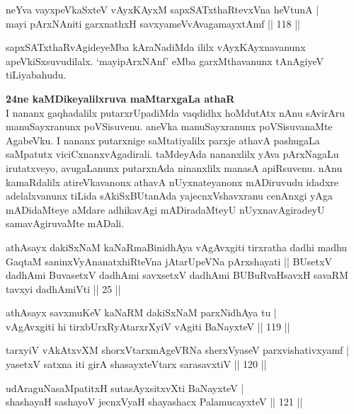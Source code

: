 \begin{shl}
neYva vayxpeVkaSxteV vAyxKAyxM sapxSATxthaRtevxVna heVtunA | \\
mayi pArxNAniti garxnathxH savxyameVvAvagamayxtAmf \hfill|| 118 || 
\end{shl}

\begin{artha}
sapxSATxthaRvAgideyeMba kAraNadiMda ililx vAyxKAyxnavanunx 
apeVkiSxsuvudilalx. `mayipArxNAnf' eMba garxMthavanunx tAnAgiyeV
tiLiyabahudu.

\textbf{24ne kaMDikeyalilxruva maMtarxgaLa athaR}\\
I nananx gaqhadalilx putarxrUpadiMda vaqdidhx hoMdutAtx nAnu sAvirAru 
manuSayxranunx poVSisuvenu. aneVka manuSayxranunx poVSisuvanaMte 
AgabeVku. I nananx putarxnige saMtatiyalilx parxje athavA pashugaLa 
saMpatutx viciCxnanxvAgadirali. taMdeyAda nananxlilx yAva pArxNagaLu 
irutatxveyo, avugaLanunx putarxnAda ninanxlilx manasA apiRsuvenu. 
nAnu kamaRdalilx atireVkavanonx athavA nUyxnateyanonx mADiruvudu 
idadxre adelalxvanunx tiLida sAkiSxBUtanAda yajecnxVshavxranu cenAnxgi 
yAga mADidaMteye aMdare adhikavAgi mADiradaMteyU nUyxnavAgiradeyU 
samavAgiruvaMte mADali.
\end{artha}

\begin{shl}
athAsayx dakiSxNaM kaNaRmaBinidhAya vAgAvxgiti tirxratha dadhi madhu GaqtaM saninxVyAnanatxhiRteVna jAtarUpeVNa pArxshayati || BUsetxV dadhAmi BuvasetxV dadhAmi savxsetxV dadhAmi BUBuRvaHsavxH savaRM tavxyi dadhAmiVti || 25 ||
\end{shl}

\begin{shl}
athAsayx savxmuKeV kaNaRM dakiSxNaM parxNidhAya tu | \\
vAgAvxgiti hi tirxbUrxRyAtarxrXyiV vAgiti BaNayxteV \hfill|| 119 || 
\end{shl}

\begin{shl}
tarxyiV vAkAtxvXM shorxVtarxmAgeVRNa sherxVyaseV parxvishativxyamf | \\
yasetxV satxna iti girA shasayxteV\s tarx sarasavxtiV \hfill|| 120 || 
\end{shl}

\begin{shl}
udAraguNasaMpatitxH sutasAyxsitxvXti BaNayxteV | \\
shashayaH sashayoV jecnxVyaH shayashacx PalamucayxteV \hfill|| 121 || 
\end{shl}

